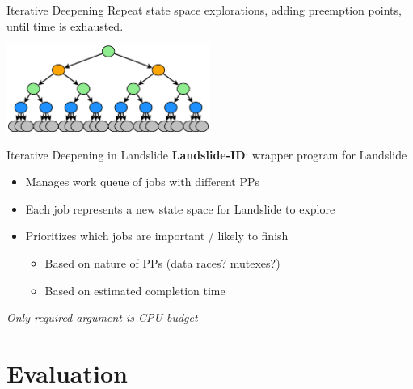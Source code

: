 \documentclass[xcolor=dvipsnames]{beamer}
\begin{document}
\begin{frame}{Iterative Deepening}
	Repeat state space explorations, adding preemption points, until time is exhausted.
	\begin{center}
		\includegraphics[width=0.5\textwidth]{tree3.pdf}
	\end{center}
\end{frame}

\begin{frame}{Iterative Deepening in Landslide}
	\textbf{Landslide-ID}: wrapper program for Landslide
	\begin{itemize}
		\item Manages work queue of jobs with different PPs
		\item Each job represents a new state space for Landslide to explore
		\item Prioritizes which jobs are important / likely to finish
		\begin{itemize}
			\item Based on nature of PPs (data races? mutexes?)
			\item Based on estimated completion time
		\end{itemize}
	\end{itemize}

	\linegap
	{\em Only required argument is CPU budget}
\end{frame}


\section{Evaluation}

\end{document}
